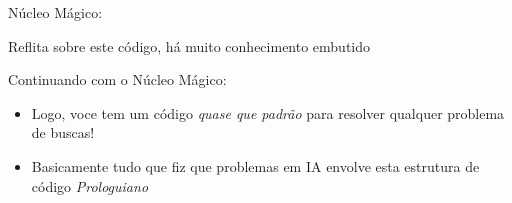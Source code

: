 \documentclass[sans]{beamer}
\begin{document}

\begin{frame}
\begin{block}{Núcleo Mágico:}


Reflita sobre este código, há muito conhecimento embutido



\end{block}
\end{frame}


\begin{frame}
\begin{block}{Continuando com o Núcleo Mágico:}
\begin{itemize}



\item Logo, voce tem um código {\em quase que padrão} para resolver qualquer
problema de buscas!

\item Basicamente tudo que fiz que problemas em IA envolve 
esta estrutura de código {\em Prologuiano}
    
\end{itemize}
\end{block}
\end{frame}
\end{document}
